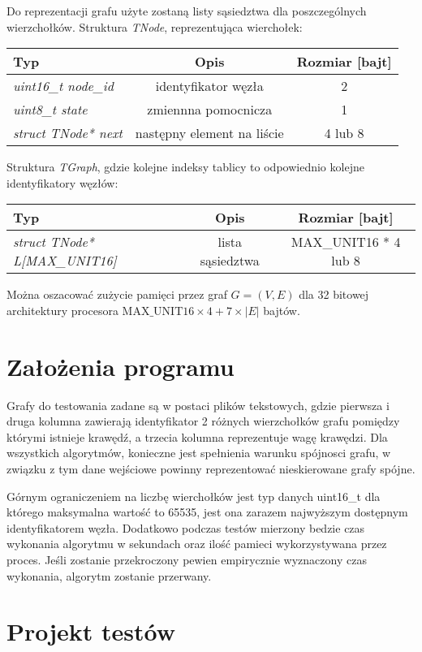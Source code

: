 \documentclass[a4paper, 10pt]{article}
\begin{document}
Do reprezentacji grafu użyte zostaną listy sąsiedztwa dla poszczególnych wierzchołków. Struktura
{\it TNode}, reprezentująca wierchołek:

\begin{tabular}{|l|c|c|}
	\hline 
  {\bf Typ} & {\bf Opis} & {\bf Rozmiar [bajt]}\\
  \hline 
  \it{uint16\_t node\_id} & identyfikator węzła & 2 \\
  \hline
  \it{ uint8\_t state} & zmiennna pomocnicza  &  1 \\
  \hline
  \it{ struct TNode* next} & następny element na liście & 4 lub 8 \\
  \hline 
\end{tabular} 

Struktura {\it TGraph}, gdzie kolejne indeksy tablicy to odpowiednio kolejne identyfikatory węzłów:

\begin{tabular}{|l|c|c|}
\hline {\bf Typ} & {\bf Opis} & {\bf Rozmiar [bajt]}\\
  \hline 
   \it{struct TNode* L[MAX\_UNIT16]  } & lista sąsiedztwa & MAX\_UNIT16 * 4 lub 8 \\
  \hline
\end{tabular} 

Można oszacować zużycie pamięci przez graf $G=(V,E)$ dla 32 bitowej architektury procesora $\text{MAX\_UNIT16}\times4+7\times|E|$ bajtów.



\section{Założenia programu}
Grafy do testowania zadane są w postaci plików tekstowych, gdzie pierwsza 
i druga kolumna zawierają identyfikator 2 różnych wierzchołków
grafu pomiędzy którymi istnieje krawędź, a trzecia kolumna reprezentuje
wagę krawędzi. Dla wszystkich algorytmów, konieczne jest spełnienia warunku spójnosci grafu, w związku z 
tym dane wejściowe powinny reprezentować nieskierowane grafy spójne. 


Górnym ograniczeniem na liczbę wierchołków jest typ danych uint16\_t
dla którego maksymalna wartość to 65535, jest ona zarazem najwyższym dostępnym
identyfikatorem węzła. Dodatkowo podczas testów mierzony bedzie czas wykonania algorytmu
w sekundach oraz ilość pamieci wykorzystywana przez proces. Jeśli zostanie przekroczony
pewien empirycznie wyznaczony czas wykonania, algorytm zostanie przerwany. 







\section{Projekt testów}
	
	





\nocite{*}

\end{document}
